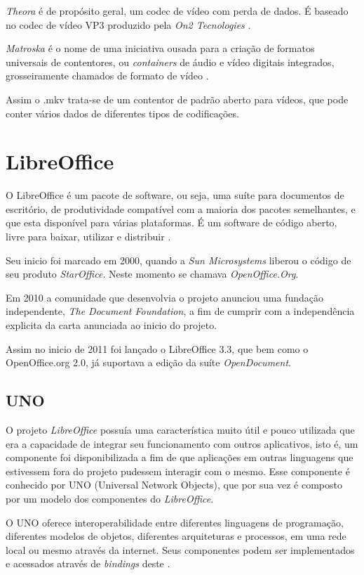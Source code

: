 \textit{Theora} é de propósito geral, um codec de vídeo com perda de dados. É baseado no codec de vídeo VP3 produzido pela \textit{On2 Tecnologies} \cite{XIPH-THEORA}.

\textit{Matroska} é o nome de uma iniciativa ousada para a criação de formatos universais de contentores, ou \textit{containers} de áudio e vídeo digitais integrados, grosseiramente chamados de formato de vídeo \cite{WIKIPEDIA-MATROSKA}.

Assim o .mkv trata-se de um contentor de padrão aberto para vídeos, que pode conter vários dados de diferentes tipos de codificações.

\section{LibreOffice}

O LibreOffice é um pacote de software, ou seja, uma suíte para documentos de escritório, de produtividade compatível com a maioria dos pacotes semelhantes, e que esta disponível para várias plataformas. É um software de código aberto, livre para baixar, utilizar e distribuir \cite{LibreOffice}.

Seu inicio foi marcado em 2000, quando a \textit{Sun Microsystems} liberou o código de seu produto \textit{StarOffice}. Neste momento se chamava \textit{OpenOffice.Org}. 

Em 2010 a comunidade que desenvolvia o projeto anunciou uma fundação independente, \textit{The Document Foundation}, a fim de cumprir com a independência explicita da carta anunciada ao inicio do projeto.

Assim no inicio de 2011 foi lançado o LibreOffice 3.3, que bem como o OpenOffice.org 2.0, já suportava a edição da suíte \textit{OpenDocument}.


\subsection{UNO}
\label{uno}

O projeto \textit{LibreOffice} possuía uma característica muito útil e pouco utilizada que era a capacidade de integrar seu funcionamento com outros aplicativos, isto é, um componente foi disponibilizada a fim de que aplicações em outras linguagens que estivessem fora do projeto pudessem interagir com o mesmo. Esse componente é conhecido por UNO (Universal Network Objects), que por sua vez é composto por um modelo dos componentes do \textit{LibreOffice}.

O UNO oferece interoperabilidade entre diferentes linguagens de programação, diferentes modelos de objetos, diferentes arquiteturas e processos, em uma rede local ou mesmo através da internet. Seus componentes podem ser implementados e acessados através de \textit{bindings} deste \cite{MINETTO-PYUNO}.

